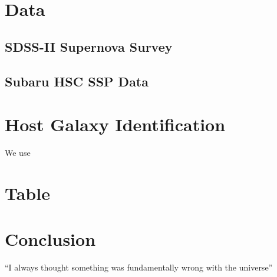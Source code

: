 \documentclass[apj,twocolumn]{aastex631}
\begin{document}
%
%

\section{Data}


\subsection{SDSS-II Supernova Survey}

\subsection{Subaru HSC SSP Data}


%


\section{Host Galaxy Identification}
We use 


\section{Table}



\section{Conclusion}
``I always thought something was fundamentally wrong with the universe''

%
%
\clearpage

\end{document}
